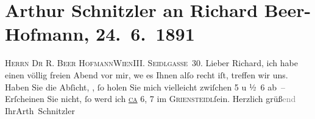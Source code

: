 

         
         \renewcommand{\erwaehntePersonen}{Personen: Richard Beer-Hofmann, Felix Salten}
         \renewcommand{\erwaehnteOrte}{Orte: Café Griensteidl, Seidlgasse, Türkenschanzpark, Wien}
         \renewcommand{\erwaehnteWerke}{}
               \section[Arthur Schnitzler an Richard Beer-Hofmann, 24. 6. 1891]{ Arthur Schnitzler an Richard Beer-Hofmann, 24. 6. 1891}\nopagebreak{}\rehead{ }\begin{ledgroupsized}[t]{13cm}\normalsize\beginnumbering \toendnotes[C]{\smallbreak\pagebreak[2]} 
\toendnotes[C]{\smallbreak}\pstart{}{\pb}\textsc{Herrn Dr R. Beer Hofmann}\pend{}\pstart{}\textsc{Wien}\pend{}\pstart{}\textsc{III. Seidlgasse 30}. \pend{}{\bigskip}\pstart
           \noindent{}{\pb}Lieber Richard, ich habe einen völlig freien Abend vor mir, we{\geminationn} es Ihnen alſo recht iſt, treffen wir uns. Haben Sie
               die Abſicht, \label{K_L00021_1v}\label{K_L00021_1h}, ſo holen Sie mich vielleicht zwiſchen
                  5 u ½ 6 ab – Erſcheinen Sie nicht, ſo werd ich \uline{\textsc{ca}}{ }6, 7 im \textsc{Griensteidl}ſein.\pend
           \pstart Herzlich grüß\textcolor{gray}{end} Ihr\spacefill\mbox{Arth Schnitzler}\pend{}
         
         \endnumbering{}\end{ledgroupsized}  \newcommand{\dateiname}{L00021}\newcommand{\titel}{Arthur Schnitzler an Richard Beer-Hofmann, 24. 6. 1891}\newcommand{\editorInnen}{Martin Anton Müller und Gerd-Hermann Susen}
      